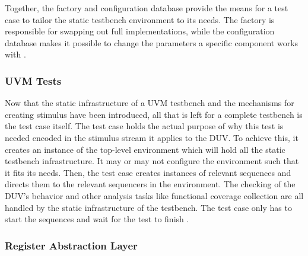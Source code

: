 Together, the factory and configuration database provide the means for a test case to tailor the static testbench
environment to its needs. The factory is responsible for swapping out full implementations, while the configuration
database makes it possible to change the parameters a specific component works with \cite[Ch. 4.3]{mehta2018asic}.

\subsubsection{UVM Tests} %

Now that the static infrastructure of a UVM testbench and the mechanisms for creating stimulus have been introduced,
all that is left for a complete testbench is the test case itself. The test case holds the actual purpose of why this
test is needed encoded in the stimulus stream it applies to the DUV. To achieve this, it creates an instance of the
top-level environment which will hold all the static testbench infrastructure. It may or may not configure the
environment such that it fits its needs. Then, the test case creates instances of relevant sequences and directs them
to the relevant sequencers in the environment. The checking of the DUV's behavior and other analysis tasks like
functional coverage collection are all handled by the static infrastructure of the testbench. The test case only has
to start the sequences and wait for the test to finish \cite[Ch. 4.3]{mehta2018asic}.

\subsubsection{Register Abstraction Layer} %

